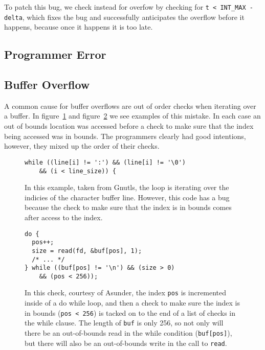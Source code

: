 \documentclass[9pt,twocolumn]{article}
\begin{document}
To patch this bug, we check instead for overfow by checking for \texttt{t < INT\_MAX - delta}, which fixes the bug and successfully anticipates the overflow before it happens, because once it happens it is too late.



\subsection{Programmer Error}

\subsection{Buffer Overflow}
A common cause for buffer overflows are out of order checks when iterating over
a buffer. In figure~\ref{fig:gnutls-bad-check} and
figure~\ref{fig:asunder-bad-check} we see examples of this mistake. In each case
an out of bounds location was accessed before a check to make sure that the
index being accessed was in bounds. The programmers clearly had good
intentions, however, they mixed up the order of their checks.

\begin{figure}[h]
\begin{lstlisting}
while ((line[i] != ':') && (line[i] != '\0')
    && (i < line_size)) {
\end{lstlisting}
\label{fig:gnutls-bad-check}
\caption{In this example, taken from Gnutls, the loop is iterating over the
indicies of the character buffer line. However, this code has a bug because the
check to make sure that the index is in bounds comes after access to the
index.}
\end{figure}

\begin{figure}[h]
\begin{lstlisting}
do {
  pos++;
  size = read(fd, &buf[pos], 1);
  /* ... */
} while ((buf[pos] != '\n') && (size > 0)
    && (pos < 256));
\end{lstlisting}
\label{fig:asunder-bad-check}
\caption{In this check, courtesy of Asunder, the index \texttt{pos} is
incremented inside of a do while loop, and then a check to make sure the index
is in bounds (\texttt{pos < 256}) is tacked on to the end of a list of checks
in the while clause. The length of \texttt{buf} is only 256, so not only will
there be an out-of-bounds read in the while condition (\texttt{buf[pos]}), but
there will also be an out-of-bounds write in the call to \texttt{read}.}
\end{figure}
\end{document}
